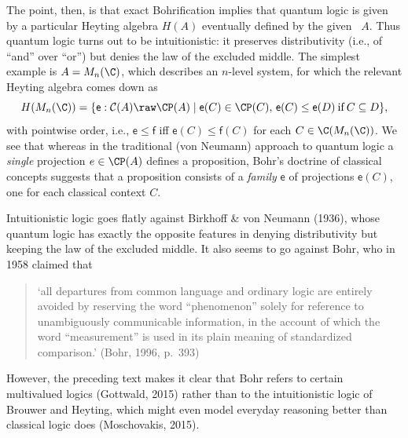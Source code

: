 \documentclass[12pt]{article}
\begin{document}
The point, then, is that exact Bohrification implies that quantum logic is given by a particular Heyting algebra $H(A)$ eventually  defined by the given \ca\ $A$.  Thus quantum logic turns out to be intuitionistic: it preserves distributivity (i.e., of ``and'' over ``or'') but denies the law of the excluded middle. The simplest example is $A=M_n(\C)$, which describes an $n$-level system, for which the relevant Heyting algebra comes down as
\begin{equation}
H(M_n(\C))=\{\mathsf{e}:\mathcal{C}(A) \raw \CP(A)\mid {\mathsf{e}}(C)\in \CP(C),\, 
{\mathsf{e}}(C)\leq {\mathsf{e}}(D)\:\mbox{if}\: C\subseteq D\}, \label{bohr}
\end{equation}
with pointwise order, i.e., $\mathsf{e}\leq \mathsf{f}$ iff $\mathsf{e}(C)\leq \mathsf{f}(C)$ for each $C\in\C(M_n(\C))$. We see that whereas in the traditional (von Neumann) approach to quantum logic a \emph{single} projection $e\in\CP(A)$ defines a proposition, Bohr's doctrine of classical concepts suggests that a proposition consists of a \emph{family}  $\mathsf{e}$ of projections $\mathsf{e}(C)$, one  for each classical context $C$.

 Intuitionistic logic goes flatly against Birkhoff \& von Neumann (1936), whose quantum logic has exactly the opposite features in denying distributivity but keeping the law of the excluded middle. It also seems to go against Bohr, who in 1958 claimed that
\begin{quotation}
`all departures from common language and ordinary logic are entirely avoided by reserving the word ``phenomenon'' solely for reference to unambiguously communicable information, in the account of which the word ``measurement'' is used in its plain meaning of standardized comparison.' (Bohr, 1996, p.\ 393)
\end{quotation}
However,  the preceding text  makes it clear that Bohr refers to certain multivalued logics (Gottwald, 2015) rather than to the intuitionistic logic of Brouwer and Heyting, which might even model everyday reasoning  better than classical logic does (Moschovakis, 2015).
\end{document}
